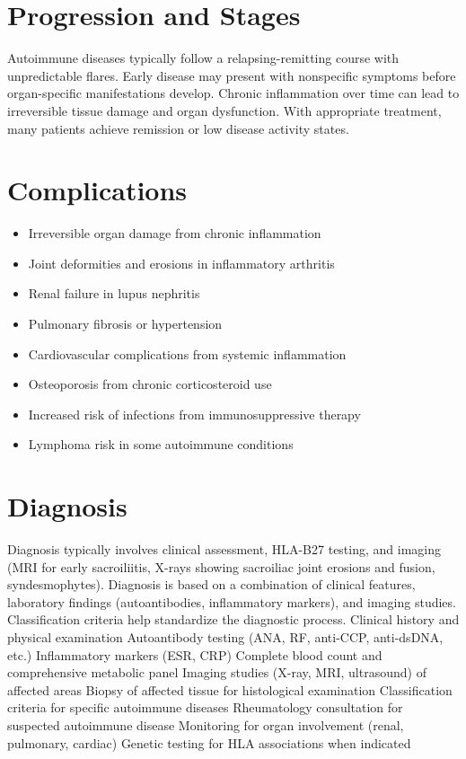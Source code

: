 \section{Progression and Stages}
Autoimmune diseases typically follow a relapsing-remitting course with unpredictable flares. Early disease may present with nonspecific symptoms before organ-specific manifestations develop. Chronic inflammation over time can lead to irreversible tissue damage and organ dysfunction. With appropriate treatment, many patients achieve remission or low disease activity states.
\section{Complications}
\begin{itemize}[noitemsep]
  \item Irreversible organ damage from chronic inflammation
  \item Joint deformities and erosions in inflammatory arthritis
  \item Renal failure in lupus nephritis
  \item Pulmonary fibrosis or hypertension
  \item Cardiovascular complications from systemic inflammation
  \item Osteoporosis from chronic corticosteroid use
  \item Increased risk of infections from immunosuppressive therapy
  \item Lymphoma risk in some autoimmune conditions
\end{itemize}
\section{Diagnosis}
Diagnosis typically involves clinical assessment, HLA-B27 testing, and imaging (MRI for early sacroiliitis, X-rays showing sacroiliac joint erosions and fusion, syndesmophytes). Diagnosis is based on a combination of clinical features, laboratory findings (autoantibodies, inflammatory markers), and imaging studies. Classification criteria help standardize the diagnostic process. Clinical history and physical examination Autoantibody testing (ANA, RF, anti-CCP, anti-dsDNA, etc.) Inflammatory markers (ESR, CRP) Complete blood count and comprehensive metabolic panel Imaging studies (X-ray, MRI, ultrasound) of affected areas Biopsy of affected tissue for histological examination Classification criteria for specific autoimmune diseases Rheumatology consultation for suspected autoimmune disease Monitoring for organ involvement (renal, pulmonary, cardiac) Genetic testing for HLA associations when indicated


